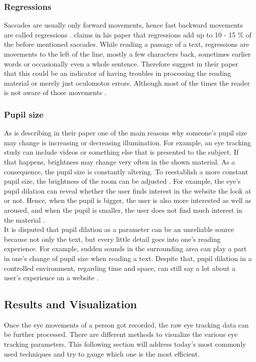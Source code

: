 \subsubsection{Regressions}
Saccades are usually only forward movements, hence fast backward movements are called regressions \autocite[]{reichle1998toward}. 
\textcite[]{rayner1998eye} claims in his paper that regressions add up to 10 - 15 \% of the before mentioned saccades.
While reading a passage of a text, regressions are movements to the left of the line, mostly a few characters back, sometimes earlier words or occasionally even a whole sentence. Therefore \textcite[]{kruger2014subtitles} suggest in their paper that this could be an indicator of having troubles in processing the reading material or merely just oculomotor errors. Although most of the times the reader is not aware of those movements \autocite[]{reichle2003ez, biedert2010eyebook}.

\subsubsection{Pupil size}
As \textcite{goldberg2002eye} is describing in their paper one of the main reasons why someone's pupil size may change is increasing or decreasing illumination. For example, an eye tracking study can include videos or something else that is presented to the subject. If that happens, brightness may change very often in the shown material. As a consequence, the pupil size is constantly altering. To reestablish a more constant pupil size, the brightness of the room can be adjusted \autocite[]{goldberg2002eye}.
For example, the eye's pupil dilation can reveal whether the user finds interest in the website the look at or not. Hence, when the pupil is bigger, the user is also more interested as well as aroused, and when the pupil is smaller, the user does not find much interest in the material \autocite[]{joachims2017accurately}.\\
It is disputed that pupil dilation as a parameter can be an unreliable source because not only the text, but every little detail goes into one's reading experience. For example, sudden sounds in the surrounding area can play a part in one's change of pupil size when reading a text. 
Despite that, pupil dilation in a controlled environment, regarding time and space, can still say a lot about a user's experience on a website \autocite[]{bruneau2002eyes}.

\subsection{Results and Visualization}
\label{subsection:ResultsVisualization}
Once the eye movements of a person got recorded, the raw eye tracking data can be further processed. There are different methods to visualize the various eye tracking parameters. This following section will address today's most commonly used techniques and try to gauge which one is the most efficient.

